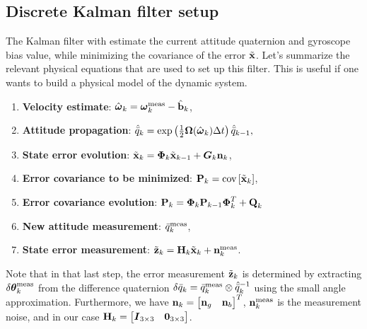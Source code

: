 \subsection{Discrete Kalman filter setup}
The Kalman filter with estimate the current attitude quaternion and gyroscope bias value, while minimizing the covariance of the error $\tilde{\textrm{\textbf{x}}}$. Let's summarize the relevant physical equations that are used to set up this filter. This is useful if one wants to build a physical model of the dynamic system.
\begin{enumerate}
\item \textbf{Velocity estimate}: $\hat{\boldsymbol\omega}_{k} = \boldsymbol\omega_k^{\textrm{meas}} - \hat{\textrm{\textbf{b}}}_{k}$,
\item \textbf{Attitude propagation}: $\hat{\bar{q}}_{k} = \exp\left(\frac{1}{2}\boldsymbol\Omega(\hat{\boldsymbol\omega}_{k})\Delta t\right)\hat{\bar{q}}_{k-1},$
\item \textbf{State error evolution}: $\tilde{\textrm{\textbf{x}}}_{k}  = \boldsymbol{\Phi}_{k}\tilde{\textrm{\textbf{x}}}_{k-1} + \boldsymbol{G}_{k}\textrm{\textbf{n}}_{k}$,
\item \textbf{Error covariance to be minimized}: $\textrm{\textbf{P}}_{k} = \textrm{cov}\left[ \tilde{\textrm{\textbf{x}}}_{k} \right]$,
\item \textbf{Error covariance evolution}: $\textrm{\textbf{P}}_{k}  =   \boldsymbol{\Phi}_k \textrm{\textbf{P}}_{k-1}\boldsymbol{\Phi}^T_k + \textrm{\textbf{Q}}_k$
\item \textbf{New attitude measurement}: $\bar{q}^{\textrm{meas}}_k$, 
\item \textbf{State error measurement}: $\tilde{\textrm{\textbf{z}}}_k = \textrm{\textbf{H}}_k\tilde{\textrm{\textbf{x}}}_k + \textbf{n}^\textrm{meas}_k$. 
\end{enumerate}

Note that in that last step, the error measurement $\tilde{\textrm{\textbf{z}}}_k$ is determined by extracting $\delta\boldsymbol\theta_k^{\textrm{meas}}$ from the difference quaternion $\delta\bar{q}_k = \bar{q}^{\textrm{meas}}_k \otimes \hat{\bar{q}}^{-1}_{k}$ using the small angle approximation. Furthermore, we have $\textrm{\textbf{n}}_k = \begin{bmatrix} \textbf{n}_g & \textbf{n}_b \end{bmatrix}^T$, $\textbf{n}^\textrm{meas}_k$ is the measurement noise, and in our case $\textrm{\textbf{H}}_k = \begin{bmatrix} \boldsymbol{I}_{3\times 3} & \boldsymbol{0}_{3\times 3} \end{bmatrix}$.

